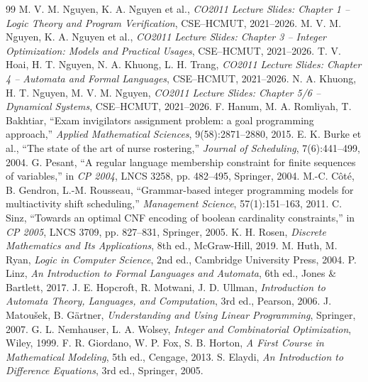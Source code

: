 \begin{thebibliography}{99}
\small
{} M. V. M. Nguyen, K. A. Nguyen et al., \textit{CO2011 Lecture Slides: Chapter 1 -- Logic Theory and Program Verification}, CSE--HCMUT, 2021--2026.
 M. V. M. Nguyen, K. A. Nguyen et al., \textit{CO2011 Lecture Slides: Chapter 3 -- Integer Optimization: Models and Practical Usages}, CSE--HCMUT, 2021--2026.
 T. V. Hoai, H. T. Nguyen, N. A. Khuong, L. H. Trang, \textit{CO2011 Lecture Slides: Chapter 4 -- Automata and Formal Languages}, CSE--HCMUT, 2021--2026.
 N. A. Khuong, H. T. Nguyen, M. V. M. Nguyen, \textit{CO2011 Lecture Slides: Chapter 5/6 -- Dynamical Systems}, CSE--HCMUT, 2021--2026.
 F. Hanum, M. A. Romliyah, T. Bakhtiar, ``Exam invigilators assignment problem: a goal programming approach,'' \textit{Applied Mathematical Sciences}, 9(58):2871--2880, 2015.
 E. K. Burke et al., ``The state of the art of nurse rostering,'' \textit{Journal of Scheduling}, 7(6):441--499, 2004.
 G. Pesant, ``A regular language membership constraint for finite sequences of variables,'' in \textit{CP 2004}, LNCS 3258, pp. 482--495, Springer, 2004.
 M.-C. C\^{o}t\'{e}, B. Gendron, L.-M. Rousseau, ``Grammar-based integer programming models for multiactivity shift scheduling,'' \textit{Management Science}, 57(1):151--163, 2011.
 C. Sinz, ``Towards an optimal CNF encoding of boolean cardinality constraints,'' in \textit{CP 2005}, LNCS 3709, pp. 827--831, Springer, 2005.
 K. H. Rosen, \textit{Discrete Mathematics and Its Applications}, 8th ed., McGraw-Hill, 2019.
 M. Huth, M. Ryan, \textit{Logic in Computer Science}, 2nd ed., Cambridge University Press, 2004.
 P. Linz, \textit{An Introduction to Formal Languages and Automata}, 6th ed., Jones \& Bartlett, 2017.
 J. E. Hopcroft, R. Motwani, J. D. Ullman, \textit{Introduction to Automata Theory, Languages, and Computation}, 3rd ed., Pearson, 2006.
 J. Matou\v{s}ek, B. G\"{a}rtner, \textit{Understanding and Using Linear Programming}, Springer, 2007.
 G. L. Nemhauser, L. A. Wolsey, \textit{Integer and Combinatorial Optimization}, Wiley, 1999.
 F. R. Giordano, W. P. Fox, S. B. Horton, \textit{A First Course in Mathematical Modeling}, 5th ed., Cengage, 2013.
 S. Elaydi, \textit{An Introduction to Difference Equations}, 3rd ed., Springer, 2005.
\end{thebibliography}